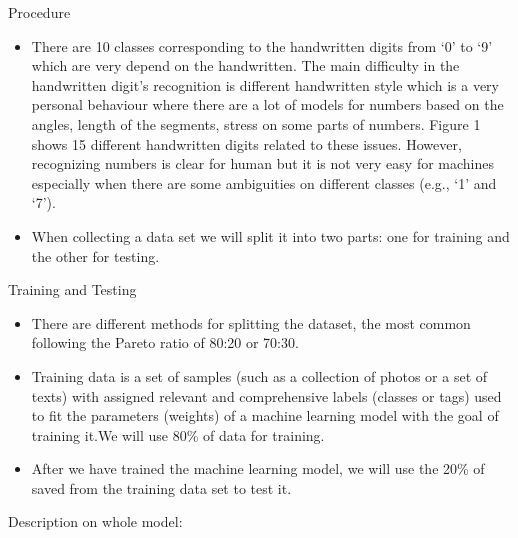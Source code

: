 \documentclass[8pt,final,hyperref={pdfpagelabels=false}]{beamer}
\theoremstyle{plain}
\begin{document}
\begin{frame}
\begin{columns}[t]
\begin{column}{.23\textwidth}
    \begin{block}{Procedure}
        \begin{itemize}
        \item There are 10 classes corresponding to the handwritten digits from ‘0’ to ‘9’ which are very depend on the handwritten. The main difficulty in the handwritten digit’s recognition is different handwritten style which is a very personal behaviour where there are a lot of models for numbers based on the angles, length of the segments, stress on some parts of numbers. Figure 1 shows 15 different handwritten digits related to these issues. However, recognizing numbers is clear for human but it is not very easy for machines especially when there are some ambiguities on different classes (e.g., ‘1’ and ‘7’).
        
         \item When collecting a data set we will split it into two parts: one for training and the other for testing.
        
        \end{itemize}
    \end{block}
    
    \begin{block}{Training and Testing}
        \begin{itemize}
        
            \item There are different methods for splitting the dataset, the most common following the Pareto ratio of 80:20 or 70:30. 
        
            \item Training data is a set of samples (such as a collection of photos or a set of texts) with assigned relevant and comprehensive labels (classes or tags) used to fit the parameters (weights) of a machine learning model with the goal of training it.We will use 80\% of data for training.
            
            \item After we have trained the machine learning model, we will use the 20\% of saved from the training data set to test it.
            
        \end{itemize}
    \end{block}
    
    \begin{block}{Description on whole model:}
        \begin{itemize}
        

\end{itemize}
\end{block}
\end{column}
\end{columns}
\end{frame}
\end{document}
